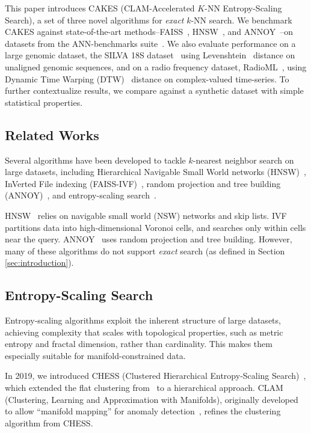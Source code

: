 This paper introduces CAKES (CLAM-Accelerated $K$-NN Entropy-Scaling Search), a set of three novel algorithms for \emph{exact} $k$-NN search.
We benchmark CAKES against state-of-the-art methods--FAISS~\cite{johnson2019billion}, HNSW~\cite{malkov2016hnsw}, and ANNOY~\cite{annoy}--on datasets from the ANN-benchmarks suite~\cite{aumuller2020ann}.
We also evaluate performance on a large genomic dataset, the SILVA 18S dataset~\cite{10.1093/nar/gks1219} using Levenshtein~\cite{levenshtein1966binary} distance on unaligned genomic sequences, and on a radio frequency dataset, RadioML~\cite{oshea2018radioml}, using Dynamic Time Warping (DTW)~\cite{gold2018dynamic} distance on complex-valued time-series.
To further contextualize results, we compare against a synthetic dataset with simple statistical properties.


\subsection{Related Works}
\label{sec:intoduction:related-works}

Several algorithms have been developed to tackle $k$-nearest neighbor search on large datasets, including Hierarchical Navigable Small World networks (HNSW)~\cite{malkov2016hnsw}, InVerted File indexing (FAISS-IVF)~\cite{faissivf}, random projection and tree building (ANNOY)~\cite{annoy}, and entropy-scaling search~\cite{yu2015entropy, ishaq2019clustered}.

HNSW~\cite{malkov2016hnsw} relies on navigable small world (NSW) networks and skip lists.
IVF~\cite{faissivf, sacks1987multikey, kent1990signature} partitions data into high-dimensional Voronoi cells, and searches only within cells near the query.
ANNOY~\cite{annoy} uses random projection and tree building.
However, many of these algorithms do not support \emph{exact} search (as defined in Section \ref{sec:introduction}).


\subsection{Entropy-Scaling Search}
\label{sec:intoduction:entropy-scaling-search}

Entropy-scaling algorithms exploit the inherent structure of large datasets, achieving complexity that scales with topological properties, such as metric entropy and fractal dimension, rather than cardinality.
This makes them especially suitable for manifold-constrained data.

In 2019, we introduced CHESS (Clustered Hierarchical Entropy-Scaling Search)~\cite{ishaq2019clustered}, which extended the flat clustering from~\cite{yu2015entropy} to a hierarchical approach.
CLAM (Clustering, Learning and Approximation with Manifolds), originally developed to allow ``manifold mapping'' for anomaly detection~\cite{ishaq2021clustered}, refines the clustering algorithm from CHESS.

